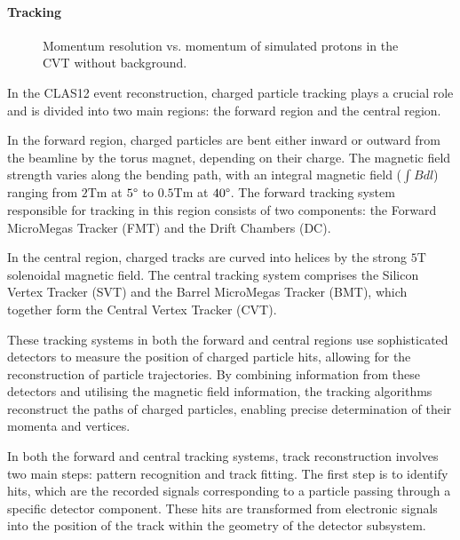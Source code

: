 \paragraph{Tracking}
    \begin{wrapfigure}{r}{0.50\textwidth}
        \centering{}
        \caption[CVT momentum resolution vs. momentum.]{Momentum resolution vs. momentum of simulated protons in the CVT without background.}
        \label{fig::cvt_pres}
    \end{wrapfigure}

    In the CLAS12 event reconstruction, charged particle tracking plays a crucial role and is divided into two main regions: the forward region and the central region.

    In the forward region, charged particles are bent either inward or outward from the beamline by the torus magnet, depending on their charge.
    The magnetic field strength varies along the bending path, with an integral magnetic field ($\int Bdl$) ranging from $2 \text{Tm}$ at $5\degree$ to $0.5 \text{Tm}$ at $40\degree$.
    The forward tracking system responsible for tracking in this region consists of two components: the Forward MicroMegas Tracker (FMT) and the Drift Chambers (DC).

    In the central region, charged tracks are curved into helices by the strong $5 \text{T}$ solenoidal magnetic field.
    The central tracking system comprises the Silicon Vertex Tracker (SVT) and the Barrel MicroMegas Tracker (BMT), which together form the Central Vertex Tracker (CVT).

    These tracking systems in both the forward and central regions use sophisticated detectors to measure the position of charged particle hits, allowing for the reconstruction of particle trajectories.
    By combining information from these detectors and utilising the magnetic field information, the tracking algorithms reconstruct the paths of charged particles, enabling precise determination of their momenta and vertices.

    In both the forward and central tracking systems, track reconstruction involves two main steps: pattern recognition and track fitting.
    The first step is to identify hits, which are the recorded signals corresponding to a particle passing through a specific detector component.
    These hits are transformed from electronic signals into the position of the track within the geometry of the detector subsystem.

